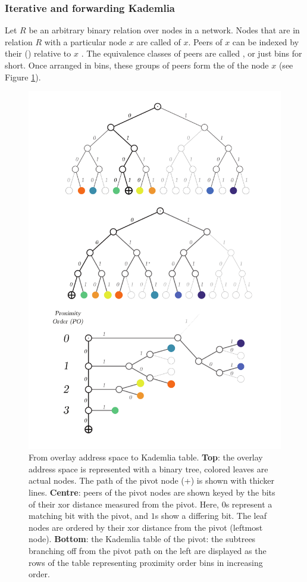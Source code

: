 \subsubsection{Iterative and forwarding Kademlia}

Let $R$ be an arbitrary binary relation over nodes in a network. Nodes that are in relation $R$ with a particular node $x$ are called  of $x$. Peers of $x$ can be indexed by their  () relative to $x$%
.
The equivalence classes of peers are called , or just bins for short. Once arranged in bins, these groups of peers form the  of the node $x$ (see Figure \ref{fig:kademlia-table}). 



\begin{figure}[htbp]
   \centering
    \includegraphics[width=.8\textwidth]{fig/kademlia-3.5_new.pdf}
   \caption[From overlay address space to Kademlia table \statusgreen]{From overlay address space to Kademlia table. \textbf{Top}: the overlay address space is represented with a binary tree, colored leaves are actual nodes. The path of the pivot node (+) is shown with thicker lines. \textbf{Centre}: peers of the pivot nodes are shown keyed by the bits of their xor distance measured from the pivot. Here, $0$s represent a matching bit with the pivot, and $1$s show a differing bit. The leaf nodes are ordered by their xor distance from the pivot (leftmost node). \textbf{Bottom}: the Kademlia table of the pivot: the subtrees branching off from the pivot path on the left are displayed as the rows of the table representing proximity order bins in increasing order.}
   \label{fig:kademlia-table}
\end{figure}

